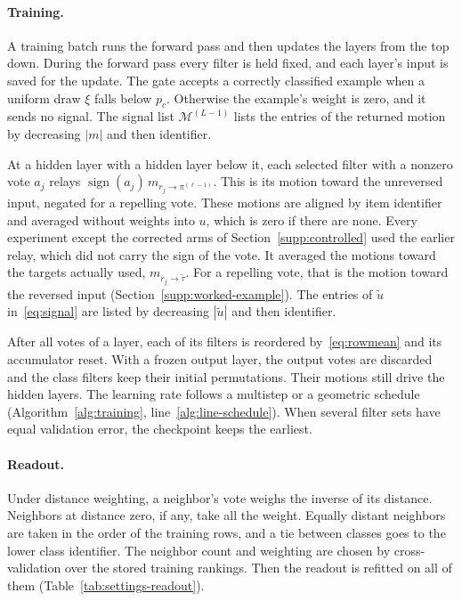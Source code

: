 \paragraph{Training.} A training batch runs the forward pass and then updates the layers from the top down. During the forward pass every filter is held fixed, and each layer's input is saved for the update. The gate accepts a correctly classified example when a uniform draw $\xi$ falls below $p_c$. Otherwise the example's weight is zero, and it sends no signal. The signal list $\mathcal{M}^{(L-1)}$ lists the entries of the returned motion by decreasing $|m|$ and then identifier.

At a hidden layer with a hidden layer below it, each selected filter with a nonzero vote $a_j$ relays $\operatorname{sign}(a_j)\,m_{r_j\to\pi^{(\ell-1)}}$. This is its motion toward the unreversed input, negated for a repelling vote. These motions are aligned by item identifier and averaged without weights into $u$, which is zero if there are none. Every experiment except the corrected arms of Section~\ref{supp:controlled} used the earlier relay, which did not carry the sign of the vote. It averaged the motions toward the targets actually used, $m_{r_j\to\tilde\tau}$. For a repelling vote, that is the motion toward the reversed input (Section~\ref{supp:worked-example}). The entries of $\tilde u$ in~\eqref{eq:signal} are listed by decreasing $|\tilde u|$ and then identifier.

After all votes of a layer, each of its filters is reordered by~\eqref{eq:rowmean} and its accumulator reset. With a frozen output layer, the output votes are discarded and the class filters keep their initial permutations. Their motions still drive the hidden layers. The learning rate follows a multistep or a geometric schedule (Algorithm~\ref{alg:training}, line~\ref{alg:line-schedule}). When several filter sets have equal validation error, the checkpoint keeps the earliest.

\paragraph{Readout.} Under distance weighting, a neighbor's vote weighs the inverse of its distance. Neighbors at distance zero, if any, take all the weight. Equally distant neighbors are taken in the order of the training rows, and a tie between classes goes to the lower class identifier. The neighbor count and weighting are chosen by cross-validation over the stored training rankings. Then the readout is refitted on all of them (Table~\ref{tab:settings-readout}).

